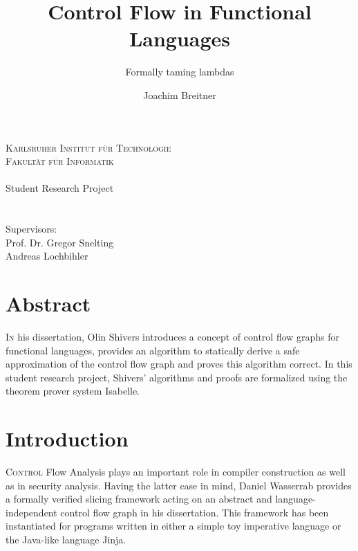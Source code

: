 \documentclass[a4paper,parskip=half,BCOR=8mm,DIV=calc,12pt]{scrbook}
\author{Joachim Breitner}
\title{Control Flow in Functional Languages}
\subtitle{Formally taming lambdas}
\begin{document}
\begin{titlepage}
\centering
\makeatletter
\textsc{\Large{Karlsruher Institut für Technologie}}\\
\vspace{.5em}
\textsc{\Large{Fakultät für Informatik}} \\
\vspace{4em}
{\Large \@author} \\
\vspace{2em}
{\large Student Research Project}\\
\vspace{2.5em}
{\sectfont\LARGE \@title }\\
\vspace{2em}
{\sectfont\Large \@subtitle }\\
\vfill
Supervisors: \\
Prof. Dr. Gregor Snelting \\
Andreas Lochbihler \\
\vspace{2em}
{\@date }
\makeatother
\end{titlepage}


\chapter*{Abstract}

\lettrine I{n} his dissertation\cite{Shivers}, Olin Shivers introduces a concept of control flow graphs for functional languages, provides an algorithm to statically derive a safe approximation of the control flow graph and proves this algorithm correct. In this student research project, Shivers’ algorithms and proofs are formalized using the theorem prover system Isabelle.


\tableofcontents

\chapter{Introduction}

\lettrine C{ontrol} Flow Analysis plays an important role in compiler construction as well as in security analysis. Having the latter case in mind, Daniel Wasserrab provides a formally verified slicing framework acting on an abstract and language-independent control flow graph in his dissertation\citep{wasserrab}. This framework has been instantiated for programs written in either a simple toy imperative language  or the Java-like language Jinja\citep{jinja}.
\end{document}
